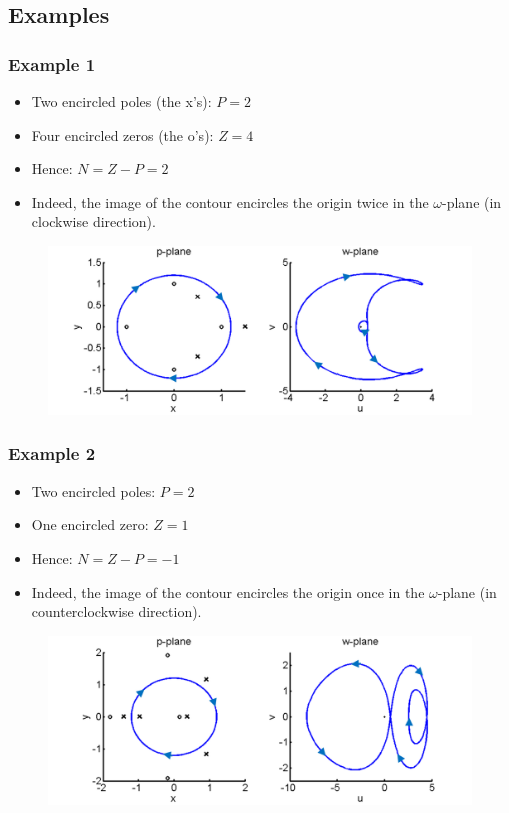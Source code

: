 \subsection{Examples}

\begin{frame}
	\frametitle{Example 1}
	\begin{itemize}
		\item Two encircled poles (the x's): $P=2$
		\item Four encircled zeros (the o's): $Z=4$
		\item Hence: $N = Z-P = 2$
		\item Indeed, the image of the contour encircles the origin twice in the $\omega$-plane (in clockwise direction).
	\end{itemize}
	\begin{figure}
		\includegraphics[width=1\linewidth]{example1}
	\end{figure}
\end{frame}

\begin{frame}
	\frametitle{Example 2}
	\begin{itemize}
		\item Two encircled poles: $P = 2$
		\item One encircled zero: $Z=1$
		\item Hence: $N=Z-P=-1$
		\item Indeed, the image of the contour encircles the origin once in the $\omega$-plane (in counterclockwise direction).
	\end{itemize}
	\begin{figure}
		\includegraphics[width=0.8\linewidth]{example2}
	\end{figure}
\end{frame}

